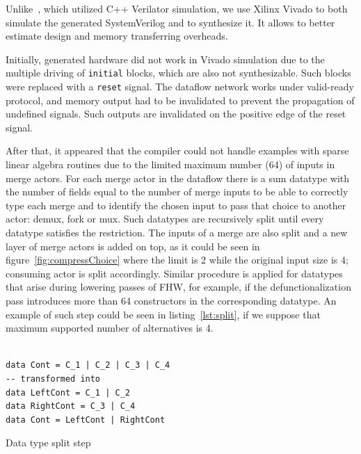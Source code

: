 Unlike~\cite{Edwards2019FHWP}, which utilized C++ Verilator simulation, we use Xilinx Vivado to both simulate the generated SystemVerilog and to synthesize it. It allows to better estimate design and memory transferring overheads.

Initially, generated hardware did not work in Vivado simulation due to the multiple driving of \texttt{initial} blocks, which are also not synthesizable. Such blocks were replaced with a \texttt{reset} signal. The dataflow network works under valid-ready protocol, and memory output had to be invalidated to prevent the propagation of undefined signals. Such outputs are invalidated on the positive edge of the reset signal.

After that, it appeared that the compiler could not handle examples with sparse linear algebra routines due to the limited maximum number (64) of inputs in merge actors. For each merge actor in the dataflow there is a sum datatype with the number of fields equal to the number of merge inputs to be able to correctly type each merge and to identify the chosen input to pass that choice to another actor: demux, fork or mux. Such datatypes are recursively split until every datatype satisfies the restriction. The inputs of a merge are also split and a new layer of merge actors is added on top, as it could be seen in figure~\ref{fig:compressChoice} where the limit is 2 while the original input size is 4; consuming actor is split accordingly. Similar procedure is applied for datatypes that arise during lowering passes of FHW, for example, if the defunctionalization pass introduces more than 64 constructors in the corresponding datatype. An example of such step could be seen in listing~\ref{lst:split}, if we suppose that maximum supported number of alternatives is 4.

\begin{listing}
\begin{center}
\begin{verbatim}

data Cont = C_1 | C_2 | C_3 | C_4
-- transformed into
data LeftCont = C_1 | C_2
data RightCont = C_3 | C_4
data Cont = LeftCont | RightCont

\end{verbatim}
\caption{Data type split step}
\label{lst:split}
\end{center}
\end{listing}


